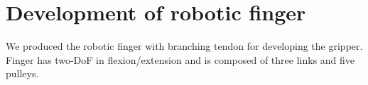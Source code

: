 \documentclass{llncs}
\begin{document}

																																			




\section{Development of robotic finger} %
\label{sec:producing}
	
We produced the robotic finger with branching tendon for developing the gripper.
Finger has two-DoF in flexion/extension and is composed of three links and five pulleys.

\end{document}
